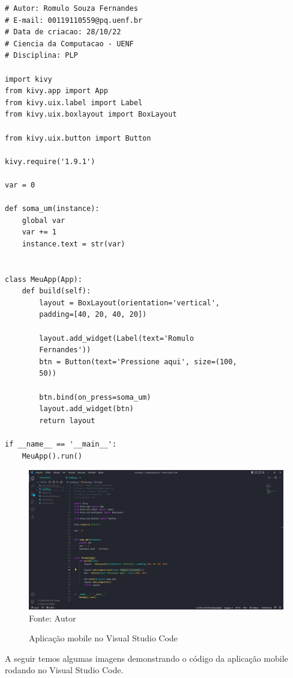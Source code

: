  
    
    
    \begin{lstlisting}
# Autor: Romulo Souza Fernandes
# E-mail: 00119110559@pq.uenf.br
# Data de criacao: 28/10/22
# Ciencia da Computacao - UENF
# Disciplina: PLP

import kivy
from kivy.app import App
from kivy.uix.label import Label
from kivy.uix.boxlayout import BoxLayout

from kivy.uix.button import Button

kivy.require('1.9.1')

var = 0

def soma_um(instance):
	global var
	var += 1
	instance.text = str(var)


class MeuApp(App):
	def build(self):
		layout = BoxLayout(orientation='vertical',
		padding=[40, 20, 40, 20])

		layout.add_widget(Label(text='Romulo 
		Fernandes'))
		btn = Button(text='Pressione aqui', size=(100,
		50))

		btn.bind(on_press=soma_um)
		layout.add_widget(btn)
		return layout

if __name__ == '__main__':
	MeuApp().run()
    \end{lstlisting}

\begin{figure}[H]
	\begin{center}
		\caption{Aplicação mobile no Visual Studio Code} \label{ling1}
		\includegraphics[width=15cm]{mobilecode.JPG} \\
		{\tiny \sf Fonte:{ Autor}}
	\end{center}
\end{figure}

	A seguir temos algumas imagens demonstrando o código da aplicação mobile rodando no Visual Studio Code.
	
